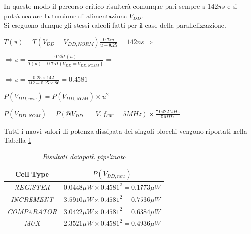 {In questo modo il percorso critico risulterà comunque pari sempre a $142 ns$ e si potrà scalare la tensione di alimentazione $V_{DD}$. \\ Si eseguono dunque gli stessi calcoli fatti per il caso della parallelizzazione.
\begin{center}
	$T(u)=T(V_{DD}=V_{DD, NORM})\frac{0.75u}{u-0.25}=142 ns \Longrightarrow$
\end{center}
\begin{center}
	$\Longrightarrow u=\frac{0.25T(u)}{T(u)-0.75T(V_{DD}=V_{DD,NORM})}\Longrightarrow$
\end{center}
\begin{center}
	$\Longrightarrow u=\frac{0.25\times 142}{142-0.75 \times 86}=0.4581$
\end{center}
\begin{center}
	$P(V_{DD,new})=P(V_{DD, NOM})\times u^{2}$
\end{center}
\begin{center}
	$P(V_{DD, NOM})=P(@V_ {DD}=1 V, f_{CK}=5 MHz)\times \frac{7.0422 MHz}{5MHz}$
\end{center}

\noindent Tutti i nuovi valori di potenza dissipata dei singoli blocchi vengono riportati nella Tabella \ref{Tab33_5}
\begin{table}[!h]\footnotesize
	\centering
	\begin{tabular}{|c|c|}
		\hline
		\textbf{Cell Type} & \textbf{$P(V_{DD, new})$} \\
		\hline
		\textit{REGISTER} & $0.0448 \mu W \times 0.4581^{2}=0.1773 \mu W$\\
		\textit{INCREMENT} & $3.5910 \mu W \times 0.4581^{2}=0.7536 \mu W$\\
		\textit{COMPARATOR} & $3.0422 \mu W \times 0.4581^{2}=0.6384 \mu W$\\
		\textit{MUX} &$2.3521 \mu W \times 0.4581^{2}=0.4936\mu W$\\
		\hline
	\end{tabular}
	\caption{\textit{Risultati datapath pipelinato}}
	\label{Tab33_5}
\end{table}

}

